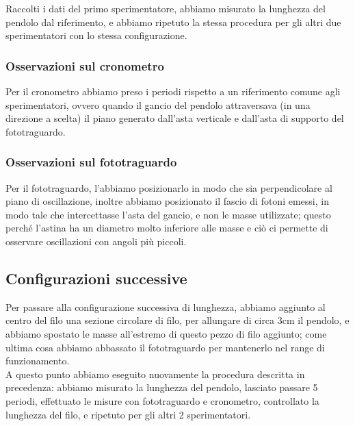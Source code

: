 Raccolti i dati del primo sperimentatore, abbiamo misurato la lunghezza del pendolo dal riferimento, e abbiamo ripetuto la stessa procedura per gli altri due sperimentatori con lo stessa configurazione.\\

\subsubsection*{Osservazioni sul cronometro} 
Per il cronometro abbiamo preso i periodi rispetto a un riferimento comune agli sperimentatori, ovvero quando il gancio del pendolo attraversava (in una direzione a scelta) il piano generato dall'asta verticale e dall'asta di supporto del fototraguardo.
\subsubsection*{Osservazioni sul fototraguardo}
Per il fototraguardo, l'abbiamo posizionarlo in modo che sia perpendicolare al piano di oscillazione, inoltre abbiamo posizionato il fascio di fotoni emessi, in modo tale che intercettasse l'asta del gancio, e non le masse utilizzate; questo perché l'astina ha un diametro molto inferiore alle masse e ciò ci permette di osservare oscillazioni con angoli più piccoli.

\subsection*{Configurazioni successive}
Per passare alla configurazione successiva di lunghezza, abbiamo aggiunto al centro del filo una sezione circolare di filo, per allungare di circa 3cm il pendolo, e abbiamo spostato le masse all'estremo di questo pezzo di filo aggiunto; come ultima cosa abbiamo abbassato il fototraguardo per mantenerlo nel range di funzionamento.\\

A questo punto abbiamo eseguito nuovamente la procedura descritta in precedenza: abbiamo misurato la lunghezza del pendolo, lasciato passare 5 periodi, effettuato le misure con fototraguardo e cronometro, controllato la lunghezza del filo, e ripetuto per gli altri 2 sperimentatori. \\

